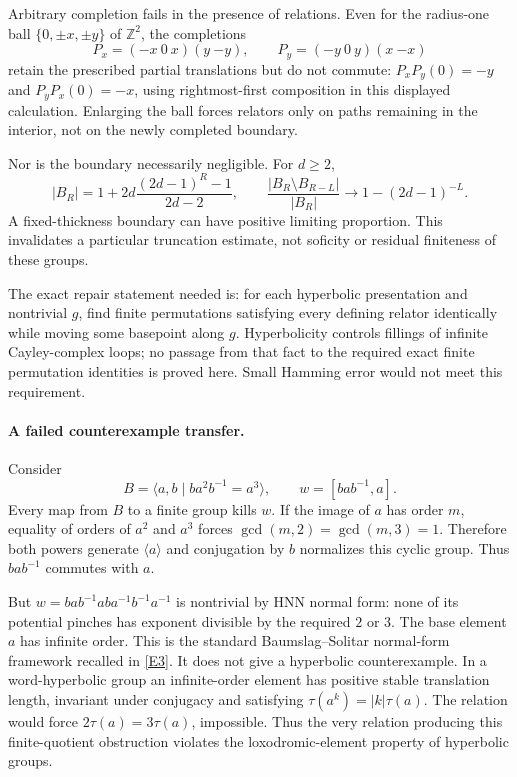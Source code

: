 \documentclass[11pt,a4paper]{article}
\newcommand{\Z}{\mathbb{Z}}
\newcommand{\eref}[2]{\hyperlink{extra:#1:#2}{[E#2]}}
\numberwithin{equation}{section}
\begin{document}
Arbitrary completion fails in the presence of relations. Even for the
radius-one ball $\{0,\pm x,\pm y\}$ of $\Z^2$, the completions
\[
 P_x=(-x\ 0\ x)(y\ {-y}),\qquad
 P_y=(-y\ 0\ y)(x\ {-x})
\]
retain the prescribed partial translations but do not commute:
$P_xP_y(0)=-y$ and $P_yP_x(0)=-x$, using rightmost-first composition in
this displayed calculation. Enlarging the ball forces relators only on
paths remaining in the interior, not on the newly completed boundary.

Nor is the boundary necessarily negligible. For $d\ge2$,
\[
 |B_R|=1+2d\frac{(2d-1)^R-1}{2d-2},\qquad
 \frac{|B_R\setminus B_{R-L}|}{|B_R|}
 \longrightarrow1-(2d-1)^{-L}.
\]
A fixed-thickness boundary can have positive limiting proportion. This
invalidates a particular truncation estimate, not soficity or residual
finiteness of these groups.

The exact repair statement needed is: for each hyperbolic presentation and
nontrivial $g$, find finite permutations satisfying every defining relator
identically while moving some basepoint along $g$. Hyperbolicity controls
fillings of infinite Cayley-complex loops; no passage from that fact to the
required exact finite permutation identities is proved here. Small Hamming
error would not meet this requirement.

\paragraph{A failed counterexample transfer.}
Consider
\[
 B=\langle a,b\mid ba^2b^{-1}=a^3\rangle,
 \qquad w=[bab^{-1},a].
\]
Every map from $B$ to a finite group kills $w$. If the image of $a$ has
order $m$, equality of orders of $a^2$ and $a^3$ forces
$\gcd(m,2)=\gcd(m,3)=1$. Therefore both powers generate $\langle a\rangle$
and conjugation by $b$ normalizes this cyclic group. Thus $bab^{-1}$
commutes with $a$.

But $w=bab^{-1}ab a^{-1}b^{-1}a^{-1}$ is nontrivial by HNN normal form:
none of its potential pinches has exponent divisible by the required
$2$ or $3$. The base element $a$ has infinite order. This is the standard
Baumslag--Solitar normal-form framework recalled in \eref{30006750}{3}.
It does not give a hyperbolic counterexample. In a word-hyperbolic group an
infinite-order element has positive stable translation length, invariant
under conjugacy and satisfying $\tau(a^k)=|k|\tau(a)$. The relation would
force $2\tau(a)=3\tau(a)$, impossible. Thus the very relation producing
this finite-quotient obstruction violates the loxodromic-element property
of hyperbolic groups.
\end{document}
